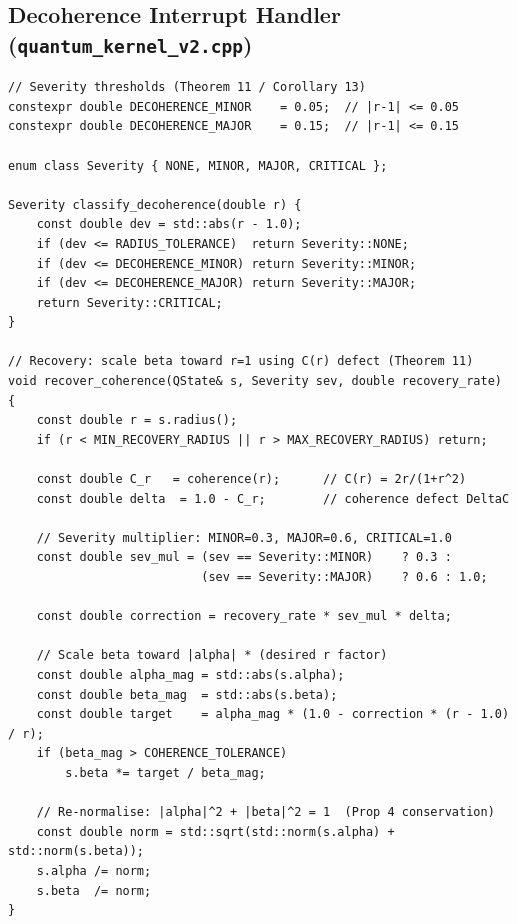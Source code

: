 \documentclass[12pt,a4paper]{article}
\theoremstyle{plain}
\theoremstyle{definition}
\theoremstyle{remark}
\begin{document}
\subsection{Decoherence Interrupt Handler (\texttt{quantum\_kernel\_v2.cpp})}
\label{app:interrupt}

\begin{lstlisting}[caption={Decoherence interrupt classification and recovery
using the coherence function C(r) from Theorem 11.},
                   label={lst:interrupt}]
// Severity thresholds (Theorem 11 / Corollary 13)
constexpr double DECOHERENCE_MINOR    = 0.05;  // |r-1| <= 0.05
constexpr double DECOHERENCE_MAJOR    = 0.15;  // |r-1| <= 0.15

enum class Severity { NONE, MINOR, MAJOR, CRITICAL };

Severity classify_decoherence(double r) {
    const double dev = std::abs(r - 1.0);
    if (dev <= RADIUS_TOLERANCE)  return Severity::NONE;
    if (dev <= DECOHERENCE_MINOR) return Severity::MINOR;
    if (dev <= DECOHERENCE_MAJOR) return Severity::MAJOR;
    return Severity::CRITICAL;
}

// Recovery: scale beta toward r=1 using C(r) defect (Theorem 11)
void recover_coherence(QState& s, Severity sev, double recovery_rate) {
    const double r = s.radius();
    if (r < MIN_RECOVERY_RADIUS || r > MAX_RECOVERY_RADIUS) return;

    const double C_r   = coherence(r);      // C(r) = 2r/(1+r^2)
    const double delta  = 1.0 - C_r;        // coherence defect DeltaC

    // Severity multiplier: MINOR=0.3, MAJOR=0.6, CRITICAL=1.0
    const double sev_mul = (sev == Severity::MINOR)    ? 0.3 :
                           (sev == Severity::MAJOR)    ? 0.6 : 1.0;

    const double correction = recovery_rate * sev_mul * delta;

    // Scale beta toward |alpha| * (desired r factor)
    const double alpha_mag = std::abs(s.alpha);
    const double beta_mag  = std::abs(s.beta);
    const double target    = alpha_mag * (1.0 - correction * (r - 1.0) / r);
    if (beta_mag > COHERENCE_TOLERANCE)
        s.beta *= target / beta_mag;

    // Re-normalise: |alpha|^2 + |beta|^2 = 1  (Prop 4 conservation)
    const double norm = std::sqrt(std::norm(s.alpha) + std::norm(s.beta));
    s.alpha /= norm;
    s.beta  /= norm;
}
\end{lstlisting}
\end{document}
